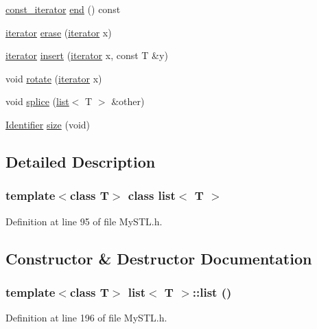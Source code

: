 \begin{DoxyCompactItemize}
\item 
\hyperlink{classlist_1_1const__iterator}{const\_\-iterator} \hyperlink{classlist_ac269b2013f9b85077b6269d99cd62fcd}{end} () const 
\item 
\hyperlink{classlist_1_1iterator}{iterator} \hyperlink{classlist_aa7a41fb4c253ddc7ebb822d581670f20}{erase} (\hyperlink{classlist_1_1iterator}{iterator} x)
\item 
\hyperlink{classlist_1_1iterator}{iterator} \hyperlink{classlist_a5ff2efab1931bc2857787e118b309e98}{insert} (\hyperlink{classlist_1_1iterator}{iterator} x, const T \&y)
\item 
void \hyperlink{classlist_a94b7f31cf58cd41726b36006a96c6bb6}{rotate} (\hyperlink{classlist_1_1iterator}{iterator} x)
\item 
void \hyperlink{classlist_acfa94cc4bde517b8bb5e61727262bf6f}{splice} (\hyperlink{classlist}{list}$<$ T $>$ \&other)
\item 
\hyperlink{Vector3_8h_a25e0b8ddd193bb84ebf6c0eeff6b1c82}{Identifier} \hyperlink{classlist_a2e3e44a048e07d3dd6dc814695ed64b8}{size} (void)
\end{DoxyCompactItemize}


\subsection{Detailed Description}
\subsubsection*{template$<$class T$>$ class list$<$ T $>$}



Definition at line 95 of file MySTL.h.



\subsection{Constructor \& Destructor Documentation}
\subsubsection[{list}]{\setlength{\rightskip}{0pt plus 5cm}template$<$class T$>$ {\bf list}$<$ T $>$::{\bf list} ()}\label{classlist_afe3efe55d3ee5dd698349834f7eac26b}


Definition at line 196 of file MySTL.h.

